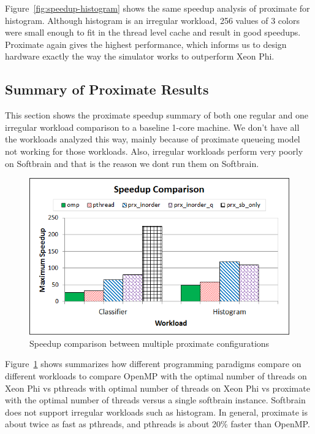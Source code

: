 Figure~\ref{fig:speedup-histogram} shows the same speedup analysis of proximate 
for histogram. Although histogram is an irregular workload, 256 values of 3 
colors were small enough to fit in the thread level cache and result in good 
speedups. Proximate again gives the highest performance, which informs us to 
design hardware exactly the way the simulator works to outperform Xeon Phi. 

\subsection{Summary of Proximate Results}

This section shows the proximate speedup summary of both one regular
and one irregular workload comparison to a baseline 1-core machine.
We don't have all the workloads analyzed this way, mainly because of proximate
queueing model not working for those workloads. Also, irregular workloads
perform very poorly on Softbrain and that is the reason we dont run them on Softbrain.  

\begin{figure}[h]
  \begin{center}
    \includegraphics[width=0.85\linewidth]{cs758-figs/speedup-comparison.png}
  \end{center}
\vspace{-0.2in}
  \caption{Speedup comparison between multiple proximate configurations}
  \label{fig:speedup-comparison}
\vspace{-0.05in}
\end{figure}

Figure~\ref{fig:speedup-comparison} shows summarizes how different programming 
paradigms compare on different workloads to compare OpenMP with the optimal number 
of threads on Xeon Phi vs pthreads with optimal number of threads on Xeon Phi vs 
proximate with the optimal number of threads versus a single softbrain instance. 
Softbrain does not support irregular workloads such as histogram. In general, 
proximate is about twice as fast as pthreads, and pthreads is about 20\% faster 
than OpenMP. 
